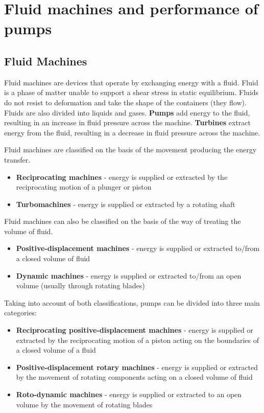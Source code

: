 \chapter{Fluid machines and performance of pumps}
\section{Fluid Machines}
Fluid machines are devices that operate by exchanging energy with a fluid. Fluid is a phase of matter unable to support a shear stress in static equilibrium. Fluids do not resist to deformation and take the shape of the containers (they flow). Fluids are also divided into liquids and gases. \textbf{Pumps} add energy to the fluid, resulting in an increase in fluid pressure across the machine. \textbf{Turbines} extract energy from the fluid, resulting in a decrease in fluid pressure across the machine.

Fluid machines are classified on the basis of the movement producing the energy transfer.
\begin{itemize}
  \item \textbf{Reciprocating machines} - energy is supplied or extracted by the reciprocating motion of a plunger or piston
  \item \textbf{Turbomachines} - energy is supplied or extracted by a rotating shaft
\end{itemize}
Fluid machines can also be classified on the basis of the way of treating the volume of fluid.
\begin{itemize}
  \item \textbf{Positive-displacement machines} - energy is supplied or extracted to/from a closed volume of fluid
  \item \textbf{Dynamic machines} - energy is supplied or extracted to/from an open volume (usually through rotating blades)
\end{itemize}
Taking into account of both classifications, pumps can be divided into three main categories:
\begin{itemize}
  \item \textbf{Reciprocating positive-displacement machines} - energy is supplied or extracted by the reciprocating motion of a piston acting on the boundaries of a closed volume of a fluid
  \item \textbf{Positive-displacement rotary machines} - energy is supplied or extracted by the movement of rotating components acting on a closed volume of fluid
  \item \textbf{Roto-dynamic machines} - energy is supplied or extracted to an open volume by the movement of rotating blades
\end{itemize}
